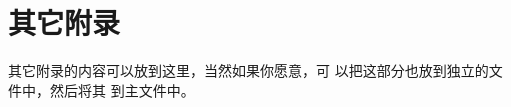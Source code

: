 % 
% 
% 
% 
% 
% 

\chapter{其它附录}
\label{chapter:other-appendix}
其它附录的内容可以放到这里，当然如果你愿意，可
以把这部分也放到独立的文件中，然后将其 \verb|| 到主文件中。